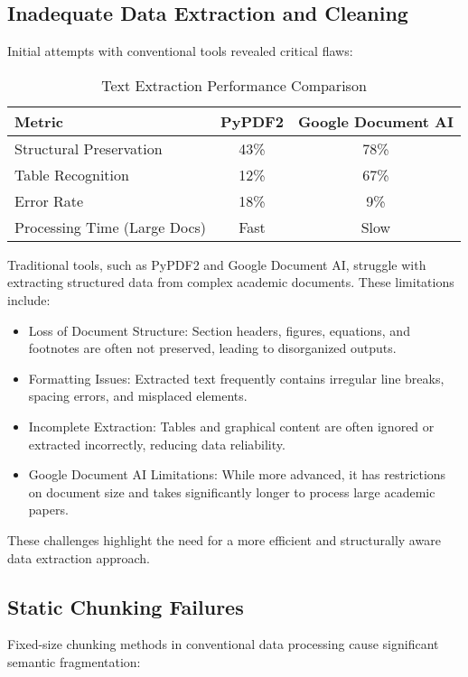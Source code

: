 \documentclass[conference]{IEEEtran}
\begin{document}
\subsection{Inadequate Data Extraction and Cleaning}  
Initial attempts with conventional tools revealed critical flaws:  

\begin{table}[h]  
\caption{Text Extraction Performance Comparison}  
\begin{tabularx}{\linewidth}{lcc}  
\toprule  
\textbf{Metric} & \textbf{PyPDF2} & \textbf{Google Document AI} \\  
\midrule  
Structural Preservation & 43\% & 78\% \\  
Table Recognition & 12\% & 67\% \\  
Error Rate & 18\% & 9\% \\  
Processing Time (Large Docs) & Fast & Slow \\  
\bottomrule  
\end{tabularx}  
\end{table}  

Traditional tools, such as PyPDF2 and Google Document AI, struggle with extracting structured data from complex academic documents. These limitations include:  

\begin{itemize}  
    \item Loss of Document Structure: Section headers, figures, equations, and footnotes are often not preserved, leading to disorganized outputs.  
    \item Formatting Issues: Extracted text frequently contains irregular line breaks, spacing errors, and misplaced elements.  
    \item Incomplete Extraction: Tables and graphical content are often ignored or extracted incorrectly, reducing data reliability.  
    \item Google Document AI Limitations: While more advanced, it has restrictions on document size and takes significantly longer to process large academic papers.  
\end{itemize}  

These challenges highlight the need for a more efficient and structurally aware data extraction approach.  

\subsection{Static Chunking Failures}  
Fixed-size chunking methods in conventional data processing cause significant semantic fragmentation:  
\end{document}
